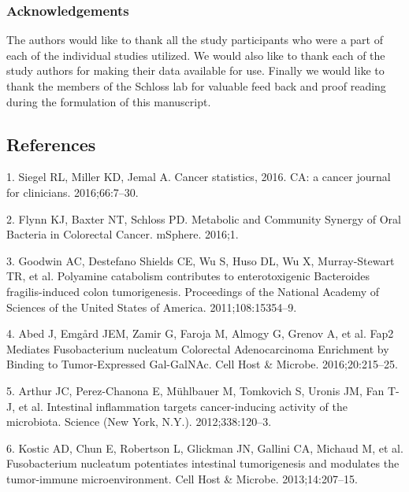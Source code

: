\documentclass[12pt,]{article}
\begin{document}
\subsubsection{Acknowledgements}\label{acknowledgements}

The authors would like to thank all the study participants who were a
part of each of the individual studies utilized. We would also like to
thank each of the study authors for making their data available for use.
Finally we would like to thank the members of the Schloss lab for
valuable feed back and proof reading during the formulation of this
manuscript.

\newpage

\subsection{References}\label{references}

\hypertarget{refs}{}
\hypertarget{ref-siegel_cancer_2016}{}
1. Siegel RL, Miller KD, Jemal A. Cancer statistics, 2016. CA: a cancer
journal for clinicians. 2016;66:7--30.

\hypertarget{ref-flynn_metabolic_2016}{}
2. Flynn KJ, Baxter NT, Schloss PD. Metabolic and Community Synergy of
Oral Bacteria in Colorectal Cancer. mSphere. 2016;1.

\hypertarget{ref-goodwin_polyamine_2011}{}
3. Goodwin AC, Destefano Shields CE, Wu S, Huso DL, Wu X, Murray-Stewart
TR, et al. Polyamine catabolism contributes to enterotoxigenic
Bacteroides fragilis-induced colon tumorigenesis. Proceedings of the
National Academy of Sciences of the United States of America.
2011;108:15354--9.

\hypertarget{ref-abed_fap2_2016}{}
4. Abed J, Emgård JEM, Zamir G, Faroja M, Almogy G, Grenov A, et al.
Fap2 Mediates Fusobacterium nucleatum Colorectal Adenocarcinoma
Enrichment by Binding to Tumor-Expressed Gal-GalNAc. Cell Host \&
Microbe. 2016;20:215--25.

\hypertarget{ref-arthur_intestinal_2012}{}
5. Arthur JC, Perez-Chanona E, Mühlbauer M, Tomkovich S, Uronis JM, Fan
T-J, et al. Intestinal inflammation targets cancer-inducing activity of
the microbiota. Science (New York, N.Y.). 2012;338:120--3.

\hypertarget{ref-kostic_fusobacterium_2013}{}
6. Kostic AD, Chun E, Robertson L, Glickman JN, Gallini CA, Michaud M,
et al. Fusobacterium nucleatum potentiates intestinal tumorigenesis and
modulates the tumor-immune microenvironment. Cell Host \& Microbe.
2013;14:207--15.
\end{document}
